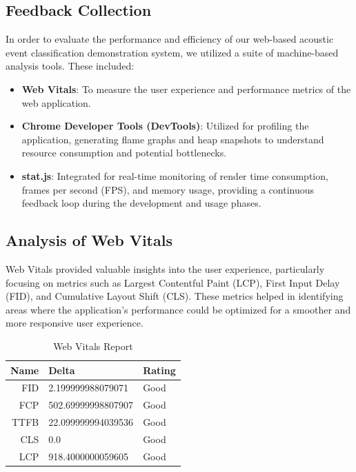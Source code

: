 \subsection{Feedback Collection}
In order to evaluate the performance and efficiency of our web-based acoustic event classification demonstration system, we utilized a suite of machine-based analysis tools. These included:

\begin{itemize}
  \item \textbf{Web Vitals}: To measure the user experience and performance metrics of the web application.
  \item \textbf{Chrome Developer Tools (DevTools)}: Utilized for profiling the application, generating flame graphs and heap snapshots to understand resource consumption and potential bottlenecks.
  \item \textbf{stat.js}: Integrated for real-time monitoring of render time consumption, frames per second (FPS), and memory usage, providing a continuous feedback loop during the development and usage phases.
\end{itemize}

\subsection{Analysis of Web Vitals}
Web Vitals provided valuable insights into the user experience, particularly focusing on metrics such as Largest Contentful Paint (LCP), First Input Delay (FID), and Cumulative Layout Shift (CLS). These metrics helped in identifying areas where the application's performance could be optimized for a smoother and more responsive user experience.

\begin{table}[h!]
  \centering
  \begin{tabular}{|r|l|l|}
    \hline
    Name & Delta              & Rating \\ [0.5ex]
    \hline\hline
    FID  & 2.199999988079071  & Good   \\
    \hline
    FCP  & 502.69999998807907 & Good   \\
    \hline
    TTFB & 22.099999994039536 & Good   \\
    \hline
    CLS  & 0.0                & Good   \\
    \hline
    LCP  & 918.4000000059605  & Good   \\[1ex]
    \hline
  \end{tabular}
  \caption{\label{table:webvitals}Web Vitals Report}
\end{table}


